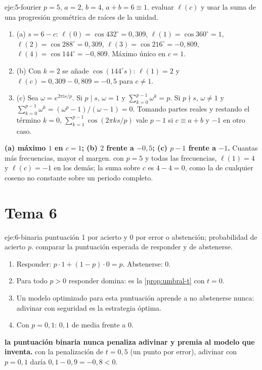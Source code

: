 \begin{solucion}{eje:5-fourier}
\datos $p=5$, $a=2$, $b=4$, $a+b=6\equiv 1$.
\planteamiento evaluar $\ell(c)$ y usar la suma de una progresión geométrica de raíces de la unidad.
\pasos
\begin{enumerate}[label=\arabic*.]
  \item (a) $s=6-c$: $\ell(0)=\cos 432^\circ=0{,}309$, $\ell(1)=\cos 360^\circ=1$, $\ell(2)=\cos 288^\circ=0{,}309$, $\ell(3)=\cos 216^\circ=-0{,}809$, $\ell(4)=\cos 144^\circ=-0{,}809$. Máximo único en $c=1$.
  \item (b) Con $k=2$ se añade $\cos(144^\circ s)$: $\ell(1)=2$ y $\ell(c)=0{,}309-0{,}809=-0{,}5$ para $c\neq 1$.
  \item (c) Sea $\omega=e^{2\pi\mathrm{i}s/p}$. Si $p\mid s$, $\omega=1$ y $\sum_{k=0}^{p-1}\omega^{k}=p$. Si $p\nmid s$, $\omega\neq 1$ y $\sum_{k=0}^{p-1}\omega^{k}=(\omega^{p}-1)/(\omega-1)=0$. Tomando partes reales y restando el término $k=0$, $\sum_{k=1}^{p-1}\cos(2\pi ks/p)$ vale $p-1$ si $c\equiv a+b$ y $-1$ en otro caso.
\end{enumerate}
\resultado \textbf{(a) máximo $1$ en $c=1$; (b) $2$ frente a $-0{,}5$; (c) $p-1$ frente a $-1$.} Cuantas más frecuencias, mayor el margen.
\comprobacion con $p=5$ y todas las frecuencias, $\ell(1)=4$ y $\ell(c)=-1$ en los demás; la suma sobre $c$ es $4-4=0$, como la de cualquier coseno no constante sobre un periodo completo.
\end{solucion}

\section{Tema 6}

\begin{solucion}{eje:6-binaria}
\datos puntuación 1 por acierto y 0 por error o abstención; probabilidad de acierto $p$.
\planteamiento comparar la puntuación esperada de responder y de abstenerse.
\pasos
\begin{enumerate}[label=\arabic*.]
  \item Responder: $p\cdot 1+(1-p)\cdot 0=p$. Abstenerse: $0$.
  \item Para todo $p>0$ responder domina: es la \cref{prop:umbral-t} con $t=0$.
  \item Un modelo optimizado para esta puntuación aprende a no abstenerse nunca: adivinar con seguridad es la estrategia óptima.
  \item Con $p=0{,}1$: $0{,}1$ de media frente a $0$.
\end{enumerate}
\resultado \textbf{la puntuación binaria nunca penaliza adivinar y premia al modelo que inventa.}
\comprobacion con la penalización de $t=0{,}5$ (un punto por error), adivinar con $p=0{,}1$ daría $0{,}1-0{,}9=-0{,}8<0$.
\end{solucion}

